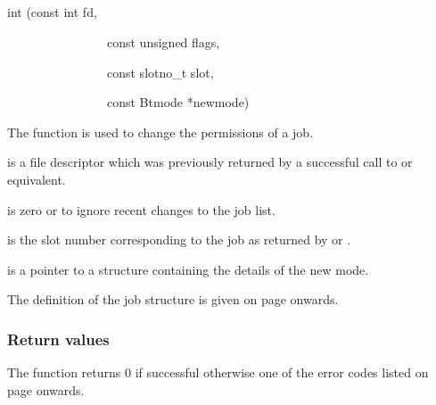 \subsection{\funcnameXBjobchmod{}}

\begin{expara}

int \funcnameXBjobchmod{}(const int fd,

\ \ \ \ \ \ \ \ \ \ \ \ \ \ \ \ const unsigned flags,

\ \ \ \ \ \ \ \ \ \ \ \ \ \ \ \ const slotno\_t slot,

\ \ \ \ \ \ \ \ \ \ \ \ \ \ \ \ const Btmode *newmode)

\end{expara}

The function \funcXBjobchmod{} is used to change the
permissions of a job.

 is a file descriptor which was previously
returned by a successful call to \funcXBopen{} or equivalent.

 is zero or
 to ignore recent changes to
the job list.

 is the slot number corresponding to the job
as returned by \funcXBjoblist{} or
\funcXBjobfindslot{}.

 is a pointer to a structure containing
the details of the new mode.

The definition of the job structure is given on page
\pageref{bkm:Jobstructure} onwards.

\subsubsection{Return values}
The function returns 0 if successful otherwise one of the error codes
listed on page \pageref{errorcodes} onwards.

